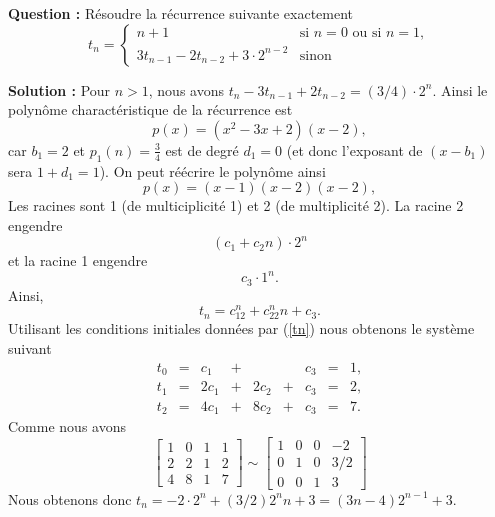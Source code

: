 \documentclass[11pt]{article} %
\newenvironment{question}[1][\unskip]{%
	\par
	\noindent
	\textbf{Question #1:}
	\noindent}
{\medskip}
\newenvironment{solution}[1][\unskip]{%
	\par
	\noindent
	\textbf{Solution #1:}
	\noindent}
{\medskip}
\begin{document}
	\section{}
	\begin{question}
		Résoudre la récurrence suivante exactement
		\begin{equation}
			\label{tn}
			t_n=\left\{
			\begin{array}{ll}
				n+1 & \text{si } n=0 \text{ ou si } n=1,\\
				3t_{n-1}-2t_{n-2}+3\cdot 2^{n-2} & \text{sinon }
			\end{array} \right.
		\end{equation}	
	\end{question}
	\begin{solution}
		Pour $n>1$, nous avons $t_n-3t_{n-1}+2t_{n-2}=(3/4)\cdot 2^n$. Ainsi le polynôme charactéristique de la récurrence est 
		$$p(x)=(x^2-3x+2)(x-2),$$ 
		car $b_1 = 2$ et $p_1(n)= \frac{3}{4}$ est de degré $d_1=0$ (et donc l'exposant de $(x-b_1)$ sera $1+d_1=1$). On peut réécrire le polynôme ainsi
		$$p(x)=(x-1)(x-2)(x-2),$$
		Les racines sont 1 (de multiciplicité 1) et 2 (de multiplicité 2). La racine 2 engendre
		$$(c_1+c_2n)\cdot 2^n$$
		et la racine 1 engendre
		$$c_3 \cdot 1^n.$$
		Ainsi,
		\begin{equation*}
			t_n=c_12^n+c_22^nn+ c_3.
		\end{equation*}
		Utilisant les conditions initiales données par (\ref{tn}) nous obtenons le système suivant
		\begin{equation*}
			\begin{array}{ccccccccc}
				t_0 & = & c_1 & + & & & c_3 &=& 1,\\
				t_1 & = & 2c_1& + & 2c_2& + & c_3 & = & 2, \\
				t_2 & = & 4c_1& + &8c_2 & + & c_3 & = & 7.
			\end{array}
		\end{equation*}
		Comme nous avons
		\begin{equation*}
			\left[\begin{array}{ccc|c}
				1 & 0 & 1 & 1\\
				2 & 2 & 1 & 2\\
				4 & 8 & 1 & 7
			\end{array}\right] \sim \left[\begin{array}{ccc|c}
			1 & 0 & 0 & -2\\
			0 & 1 & 0 & 3/2\\
			0 & 0 & 1 & 3
		\end{array}\right]
	\end{equation*}
	Nous obtenons donc $t_n=-2 \cdot 2^n +(3/2)2^n n + 3 = (3n-4)2^{n-1}+ 3.$
\end{solution}
\end{document}
